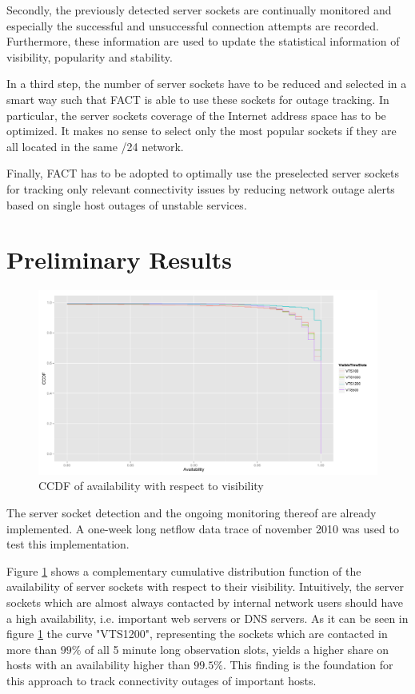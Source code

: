 \documentclass{sigcomm-alternate}
\begin{document}
Secondly, the previously detected server sockets are continually
monitored and especially the successful and unsuccessful connection
attempts are recorded. Furthermore, these information are used to update
the statistical information of visibility, popularity and stability.

In a third step, the number of server sockets have to be reduced and
selected in a smart way such that FACT is able to use these sockets
for outage tracking. In particular, the server sockets coverage of the
Internet address space has to be optimized. It makes no sense to select
only the most popular sockets if they are all located in the same /24
network.

Finally, FACT has to be adopted to optimally use the preselected server
sockets for tracking only relevant connectivity issues by reducing
network outage alerts based on single host outages of unstable services.


\section{Preliminary Results}
\begin{figure}[ht!]
\centering
\includegraphics[width=18cm]{images/RATIO_VTS_External.pdf}
\caption{CCDF of availability with respect to visibility}
\label{fig:RatioVTS}
\end{figure}
The server socket detection and the ongoing monitoring thereof are already implemented. A one-week long netflow data trace of november 2010 was used to test this implementation. 

Figure \ref{fig:RatioVTS} shows a complementary cumulative distribution function of the availability of server sockets with respect to their visibility. Intuitively, the server sockets which are almost always contacted by internal network users should have a high availability, i.e. important web servers or DNS servers. As it can be seen in figure \ref{fig:RatioVTS} the curve "VTS1200", representing the sockets which are contacted in more than $99\%$ of all 5 minute long observation slots, yields a higher share on hosts with an availability higher than $99.5\%$. This finding is the foundation for this approach to track connectivity outages of important hosts. 
\end{document}

